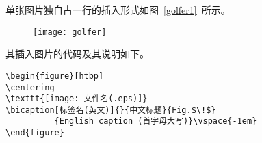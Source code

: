 


单张图片独自占一行的插入形式如图~\ref{golfer1}~所示。
\begin{figure}[htbp]
\centering
\texttt{[image: golfer]}
\vspace{-1em}
\end{figure}

其插入图片的代码及其说明如下。
\begin{verbatim}
\begin{figure}[htbp]
\centering
\texttt{[image: 文件名(.eps)]}
\bicaption[标签名(英文)]{}{中文标题}{Fig.$\!$}
          {English caption (首字母大写)}\vspace{-1em}
\end{figure}
\end{verbatim}